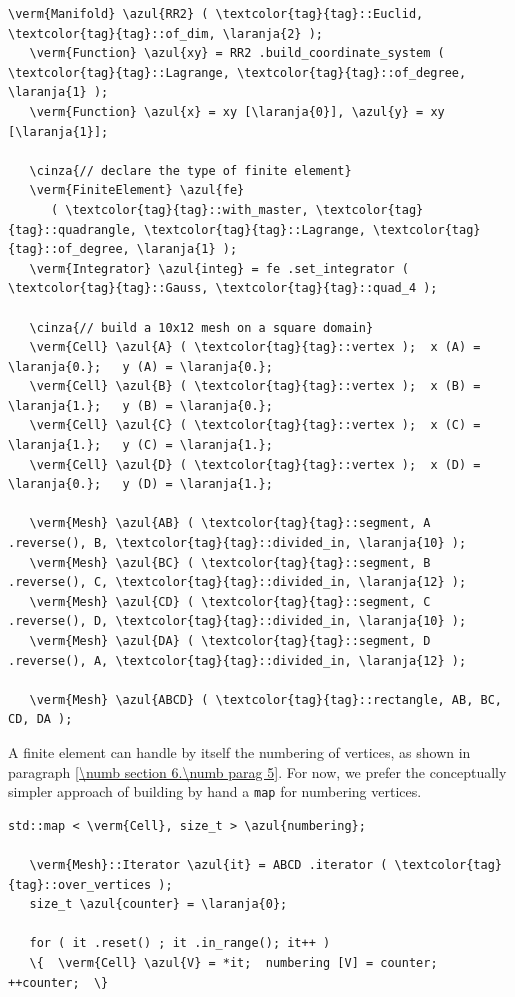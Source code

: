 \begin{Verbatim}[commandchars=\\\{\},formatcom=\small\tt,frame=single,
   label=parag-\ref{\numb section 6.\numb parag 3}.cpp,rulecolor=\color{moldura},
   baselinestretch=0.94,framesep=2mm                                            ]
   \verm{Manifold} \azul{RR2} ( \textcolor{tag}{tag}::Euclid, \textcolor{tag}{tag}::of_dim, \laranja{2} );
   \verm{Function} \azul{xy} = RR2 .build_coordinate_system ( \textcolor{tag}{tag}::Lagrange, \textcolor{tag}{tag}::of_degree, \laranja{1} );
   \verm{Function} \azul{x} = xy [\laranja{0}], \azul{y} = xy [\laranja{1}];

   \cinza{// declare the type of finite element}
   \verm{FiniteElement} \azul{fe}
      ( \textcolor{tag}{tag}::with_master, \textcolor{tag}{tag}::quadrangle, \textcolor{tag}{tag}::Lagrange, \textcolor{tag}{tag}::of_degree, \laranja{1} );
   \verm{Integrator} \azul{integ} = fe .set_integrator ( \textcolor{tag}{tag}::Gauss, \textcolor{tag}{tag}::quad_4 );

   \cinza{// build a 10x12 mesh on a square domain}
   \verm{Cell} \azul{A} ( \textcolor{tag}{tag}::vertex );  x (A) = \laranja{0.};   y (A) = \laranja{0.};
   \verm{Cell} \azul{B} ( \textcolor{tag}{tag}::vertex );  x (B) = \laranja{1.};   y (B) = \laranja{0.};
   \verm{Cell} \azul{C} ( \textcolor{tag}{tag}::vertex );  x (C) = \laranja{1.};   y (C) = \laranja{1.};
   \verm{Cell} \azul{D} ( \textcolor{tag}{tag}::vertex );  x (D) = \laranja{0.};   y (D) = \laranja{1.};

   \verm{Mesh} \azul{AB} ( \textcolor{tag}{tag}::segment, A .reverse(), B, \textcolor{tag}{tag}::divided_in, \laranja{10} );
   \verm{Mesh} \azul{BC} ( \textcolor{tag}{tag}::segment, B .reverse(), C, \textcolor{tag}{tag}::divided_in, \laranja{12} );
   \verm{Mesh} \azul{CD} ( \textcolor{tag}{tag}::segment, C .reverse(), D, \textcolor{tag}{tag}::divided_in, \laranja{10} );
   \verm{Mesh} \azul{DA} ( \textcolor{tag}{tag}::segment, D .reverse(), A, \textcolor{tag}{tag}::divided_in, \laranja{12} );

   \verm{Mesh} \azul{ABCD} ( \textcolor{tag}{tag}::rectangle, AB, BC, CD, DA );
\end{Verbatim}

A finite element can handle by itself the numbering of vertices, as shown in paragraph
\ref{\numb section 6.\numb parag 5}.
For now, we prefer the conceptually simpler approach of building by hand a {\small\tt map}
for numbering vertices.

\begin{Verbatim}[commandchars=\\\{\},formatcom=\small\tt,frame=single,
   label=parag-\ref{\numb section 6.\numb parag 3}.cpp,rulecolor=\color{moldura},
   baselinestretch=0.94,framesep=2mm                                            ]
   std::map < \verm{Cell}, size_t > \azul{numbering};

   \verm{Mesh}::Iterator \azul{it} = ABCD .iterator ( \textcolor{tag}{tag}::over_vertices );
   size_t \azul{counter} = \laranja{0};

   for ( it .reset() ; it .in_range(); it++ )
   \{  \verm{Cell} \azul{V} = *it;  numbering [V] = counter;  ++counter;  \}
\end{Verbatim}

